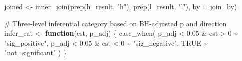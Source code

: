 \documentclass[
  letterpaper,
  DIV=11,
  numbers=noendperiod]{scrartcl}
\newenvironment{Shaded}{\begin{snugshade}}{\end{snugshade}}
\newcommand{\AttributeTok}[1]{\textcolor[rgb]{0.40,0.45,0.13}{#1}}
\newcommand{\CommentTok}[1]{\textcolor[rgb]{0.37,0.37,0.37}{#1}}
\newcommand{\ConstantTok}[1]{\textcolor[rgb]{0.56,0.35,0.01}{#1}}
\newcommand{\ControlFlowTok}[1]{\textcolor[rgb]{0.00,0.23,0.31}{\textbf{#1}}}
\newcommand{\DecValTok}[1]{\textcolor[rgb]{0.68,0.00,0.00}{#1}}
\newcommand{\FloatTok}[1]{\textcolor[rgb]{0.68,0.00,0.00}{#1}}
\newcommand{\FunctionTok}[1]{\textcolor[rgb]{0.28,0.35,0.67}{#1}}
\newcommand{\NormalTok}[1]{\textcolor[rgb]{0.00,0.23,0.31}{#1}}
\newcommand{\OtherTok}[1]{\textcolor[rgb]{0.00,0.23,0.31}{#1}}
\newcommand{\SpecialCharTok}[1]{\textcolor[rgb]{0.37,0.37,0.37}{#1}}
\newcommand{\StringTok}[1]{\textcolor[rgb]{0.13,0.47,0.30}{#1}}
\begin{document}
\begin{Shaded}
\begin{Highlighting}[]
\NormalTok{  joined }\OtherTok{\textless{}{-}} \FunctionTok{inner\_join}\NormalTok{(}\FunctionTok{prep}\NormalTok{(h\_result, }\StringTok{"h"}\NormalTok{), }\FunctionTok{prep}\NormalTok{(l\_result, }\StringTok{"l"}\NormalTok{), }\AttributeTok{by =}\NormalTok{ join\_by)}

  \CommentTok{\# Three{-}level inferential category based on BH{-}adjusted p and direction}
\NormalTok{  infer\_cat }\OtherTok{\textless{}{-}} \ControlFlowTok{function}\NormalTok{(est, p\_adj) \{}
    \FunctionTok{case\_when}\NormalTok{(}
\NormalTok{      p\_adj }\SpecialCharTok{\textless{}} \FloatTok{0.05} \SpecialCharTok{\&}\NormalTok{ est }\SpecialCharTok{\textgreater{}} \DecValTok{0} \SpecialCharTok{\textasciitilde{}} \StringTok{"sig\_positive"}\NormalTok{,}
\NormalTok{      p\_adj }\SpecialCharTok{\textless{}} \FloatTok{0.05} \SpecialCharTok{\&}\NormalTok{ est }\SpecialCharTok{\textless{}} \DecValTok{0} \SpecialCharTok{\textasciitilde{}} \StringTok{"sig\_negative"}\NormalTok{,}
      \ConstantTok{TRUE}                   \SpecialCharTok{\textasciitilde{}} \StringTok{"not\_significant"}
\NormalTok{    )}
\NormalTok{  \}}


\end{Highlighting}
\end{Shaded}
\end{document}
